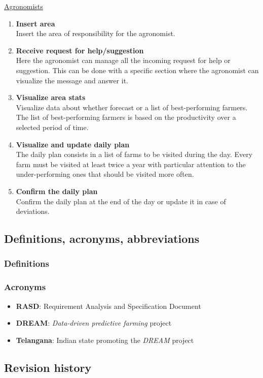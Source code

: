 \documentclass[table, 12pt]{article}
\begin{document}
\underline{Agronomists}
\begin{enumerate}
    \item \textbf{Insert area}\\
    Insert the area of responsibility for the agronomist.
    \item \textbf{Receive request for help/suggestion}\\
    Here the agronomist can manage all the incoming request for help or suggestion.
    This can be done with a specific section where the agronomist can visualize the message and answer it.
    \item \textbf{Visualize area stats}\\
    Visualize data about whether forecast or a list of best-performing farmers.
    The list of best-performing farmers is based on the productivity over a selected period of time.
    \item \textbf{Visualize and update daily plan}\\
    The daily plan consists in a list of farms to be visited during the day.
    Every farm must be visited at least twice a year with particular attention to the under-performing ones that 
    should be visited more often.
    \item \textbf{Confirm the daily plan}\\
    Confirm the daily plan at the end of the day or update it in case of deviations.
\end{enumerate}

\subsection{Definitions, acronyms, abbreviations}
\subsubsection*{Definitions}
\subsubsection*{Acronyms}
\begin{itemize}
    \item \textbf{RASD}: Requirement Analysis and Specification Document
    \item \textbf{DREAM}: \emph{Data-driven predictive farming} project
    \item \textbf{Telangana}: Indian state promoting the \emph{DREAM} project
\end{itemize}
\subsection{Revision history}
\end{document}
